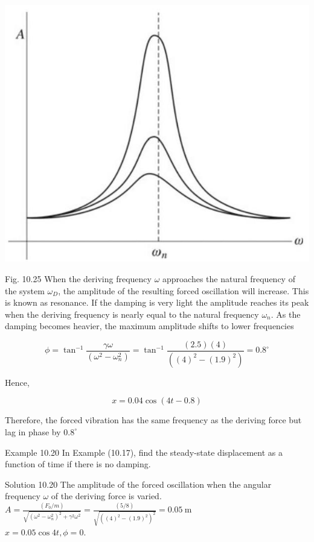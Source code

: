 \documentclass[10pt]{article}
\begin{document}
\begin{center}
\includegraphics[max width=\textwidth]{2024_09_13_db1f357d2aad0a03eb2eg-177(1)}
\end{center}

Fig. 10.25 When the deriving frequency $\omega$ approaches the natural frequency of the system $\omega_{D}$, the amplitude of the resulting forced oscillation will increase. This is known as resonance. If the damping is very light the amplitude reaches its peak when the deriving frequency is nearly equal to the natural frequency $\omega_{n}$. As the damping becomes heavier, the maximum amplitude shifts to lower frequencies

$$
\phi=\tan ^{-1} \frac{\gamma \omega}{\left(\omega^{2}-\omega_{n}^{2}\right)}=\tan ^{-1} \frac{(2.5)(4)}{\left((4)^{2}-(1.9)^{2}\right)}=0.8^{\circ}
$$

Hence,

$$
x=0.04 \cos (4 t-0.8)
$$

Therefore, the forced vibration has the same frequency as the deriving force but lag in phase by $0.8^{\circ}$

Example 10.20 In Example (10.17), find the steady-state displacement as a function of time if there is no damping.

Solution 10.20 The amplitude of the forced oscillation when the angular frequency $\omega$ of the deriving force is varied.\\
$A=\frac{\left(F_{0} / m\right)}{\sqrt{\left(\omega^{2}-\omega_{n}^{2}\right)^{2}+\gamma^{2} \omega^{2}}}=\frac{(5 / 8)}{\sqrt{\left((4)^{2}-(1.9)^{2}\right)^{2}}}=0.05 \mathrm{~m}$\\
$x=0.05 \cos 4 t, \phi=0$.
\end{document}
